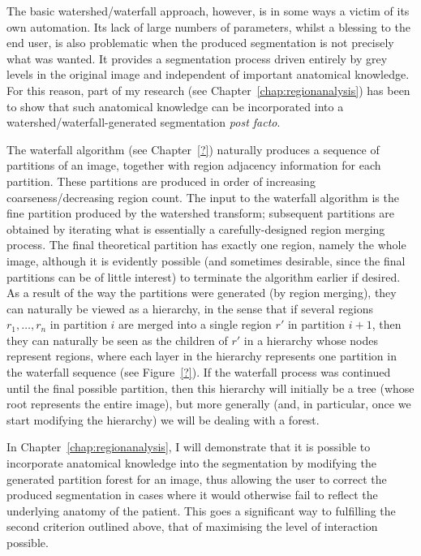 The basic watershed/waterfall approach, however, is in some ways a victim of its own automation. Its lack of large numbers of parameters, whilst a blessing to the end user, is also problematic when the produced segmentation is not precisely what was wanted. It provides a segmentation process driven entirely by grey levels in the original image and independent of important anatomical knowledge. For this reason, part of my research (see Chapter~\ref{chap:regionanalysis}) has been to show that such anatomical knowledge can be incorporated into a watershed/waterfall-generated segmentation \emph{post facto}.

The waterfall algorithm (see Chapter~\ref{?}) naturally produces a sequence of partitions of an image, together with region adjacency information for each partition. These partitions are produced in order of increasing coarseness/decreasing region count. The input to the waterfall algorithm is the fine partition produced by the watershed transform; subsequent partitions are obtained by iterating what is essentially a carefully-designed region merging process. The final theoretical partition has exactly one region, namely the whole image, although it is evidently possible (and sometimes desirable, since the final partitions can be of little interest) to terminate the algorithm earlier if desired. As a result of the way the partitions were generated (by region merging), they can naturally be viewed as a hierarchy, in the sense that if several regions $r_1,\ldots,r_n$ in partition $i$ are merged into a single region $r'$ in partition $i+1$, then they can naturally be seen as the children of $r'$ in a hierarchy whose nodes represent regions, where each layer in the hierarchy represents one partition in the waterfall sequence (see Figure~\ref{?}). If the waterfall process was continued until the final possible partition, then this hierarchy will initially be a tree (whose root represents the entire image), but more generally (and, in particular, once we start modifying the hierarchy) we will be dealing with a forest.

In Chapter~\ref{chap:regionanalysis}, I will demonstrate that it is possible to incorporate anatomical knowledge into the segmentation by modifying the generated partition forest for an image, thus allowing the user to correct the produced segmentation in cases where it would otherwise fail to reflect the underlying anatomy of the patient. This goes a significant way to fulfilling the second criterion outlined above, that of maximising the level of interaction possible.